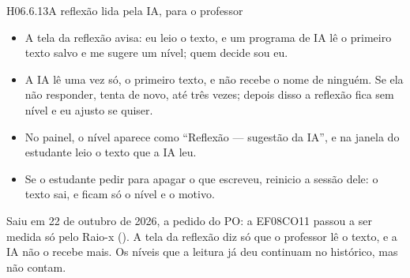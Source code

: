 \begin{historia}{H06.6.13}{A reflexão lida pela IA, para o professor}{\arquivada}
\aceite
\begin{itemize}
  \item A tela da reflexão avisa: eu leio o texto, e um programa de IA lê o
    primeiro texto salvo e me sugere um nível; quem decide sou eu.
  \item A IA lê uma vez só, o primeiro texto, e não recebe o nome de ninguém.
    Se ela não responder, tenta de novo, até três vezes; depois disso a
    reflexão fica sem nível e eu ajusto se quiser.
  \item No painel, o nível aparece como \enquote{Reflexão --- sugestão da IA},
    e na janela do estudante leio o texto que a IA leu.
  \item Se o estudante pedir para apagar o que escreveu, reinicio a sessão
    dele: o texto sai, e ficam só o nível e o motivo.
\end{itemize}
Saiu em 22 de outubro de 2026, a pedido do PO: a EF08CO11 passou a ser
medida só pelo Raio-x (). A tela da reflexão diz só que o
professor lê o texto, e a IA não o recebe mais. Os níveis que a leitura já deu
continuam no histórico, mas não contam.
\end{historia}

